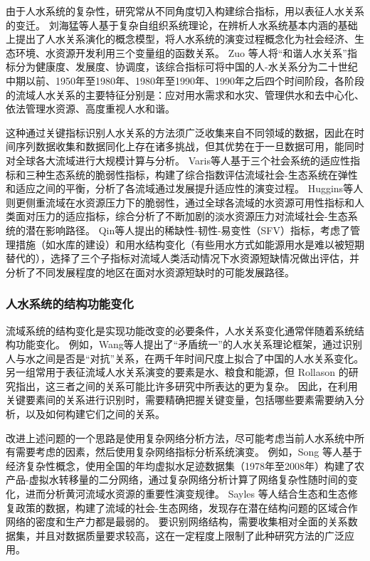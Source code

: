 由于人水系统的复杂性，研究常从不同角度切入构建综合指标，用以表征人水关系的变迁。
刘海猛等人基于复杂自组织系统理论，在辨析人水系统基本内涵的基础上提出了人水关系演化的概念模型，将人水系统的演变过程概念化为社会经济、生态环境、水资源开发利用三个变量组的函数关系\cite{liu2014}。
Zuo 等人将“和谐人水关系”指标分为健康度、发展度、协调度\cite{zuo2008}，该综合指标可将中国的人-水关系分为二十世纪中期以前、1950年至1980年、1980年至1990年、1990年之后四个时间阶段，各阶段的流域人水关系的主要特征分别是：应对用水需求和水灾、管理供水和去中心化、依法管理水资源、高度重视人水和谐\cite{zuo2016a}。

这种通过关键指标识别人水关系的方法须广泛收集来自不同领域的数据，因此在时间序列数据收集和数据同化上存在诸多挑战，但其优势在于一旦数据可用，能同时对全球各大流域进行大规模计算与分析。
Varis等人基于三个社会系统的适应性指标和三种生态系统的脆弱性指标，构建了综合指数评估流域社会-生态系统在弹性和适应之间的平衡，分析了各流域通过发展提升适应性的演变过程\cite{varis2019}。
Huggins等人则更侧重流域在水资源压力下的脆弱性，通过全球各流域的水资源可用性指标和人类面对压力的适应指标，综合分析了不断加剧的淡水资源压力对流域社会-生态系统的潜在影响路径\cite{huggins2022}。
Qin等人提出的稀缺性-韧性-易变性（SFV）指标，考虑了管理措施（如水库的建设）和用水结构变化（有些用水方式如能源用水是难以被短期替代的），选择了三个子指标对流域人类活动情况下水资源短缺情况做出评估，并分析了不同发展程度的地区在面对水资源短缺时的可能发展路径\cite{qin2019}。

\subsubsection{人水系统的结构功能变化}

流域系统的结构变化是实现功能改变的必要条件，人水关系变化通常伴随着系统结构功能变化。
例如，Wang等人提出了“矛盾统一”的人水关系理论框架，通过识别人与水之间是否是“对抗”关系，在两千年时间尺度上拟合了中国的人水关系变化\cite{wang2017}。
另一组常用于表征流域人水关系演变的要素是水、粮食和能源，但 Rollason 的研究指出，这三者之间的关系可能比许多研究中所表达的更为复杂\cite{rollason2021}。
因此，在利用关键要素间的关系进行识别时，需要精确把握关键变量，包括哪些要素需要纳入分析，以及如何构建它们之间的关系\cite{zhangzongyong2020, wang2021}。

改进上述问题的一个思路是使用复杂网络分析方法，尽可能考虑当前人水系统中所有需要考虑的因素，然后使用复杂网络指标分析系统演变\cite{sayles2019, bodin2017b}。
例如，Song 等人基于经济复杂性概念，使用全国的年均虚拟水足迹数据集（1978年至2008年）构建了农产品-虚拟水转移量的二分网络，通过复杂网络分析计算了网络复杂性随时间的变化，进而分析黄河流域水资源的重要性演变规律\cite{song2022}。
Sayles 等人结合生态和生态修复政策的数据，构建了流域的社会-生态网络，发现存在潜在结构问题的区域合作网络的密度和生产力都是最弱的\cite{sayles2017}。
要识别网络结构，需要收集相对全面的关系数据集，并且对数据质量要求较高，这在一定程度上限制了此种研究方法的广泛应用。

